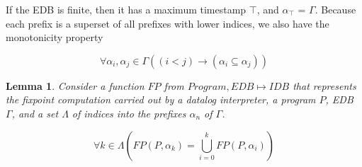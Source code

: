 If the EDB is finite, then it has a maximum timestamp $\top$, and $\alpha_{\top}$ = $\Gamma$.  Because each prefix is a superset of all 
prefixes with lower indices, we also have the monotonicity property

\begin{equation}
\forall \alpha_{i}, \alpha_{j} \in \Gamma ((i < j) \to (\alpha_{i} \subseteq \alpha_{j}))
\end{equation}



\newtheorem{lemma}{Lemma} 
\begin{lemma}

Consider a function $FP$ from $Program, EDB \mapsto IDB$ that represents the \emph{fixpoint} computation carried out by a datalog interpreter,
a program $P$, EDB $\Gamma$, and a set $\Lambda$ of indices into the prefixes $\alpha_{n}$ of $\Gamma$.


\begin{equation}
\forall k \in \Lambda (FP(P, \alpha_{k}) =  \displaystyle \bigcup_{i=0}^{k} FP(P, \alpha_{i}))
\end{equation}
\end{lemma}



